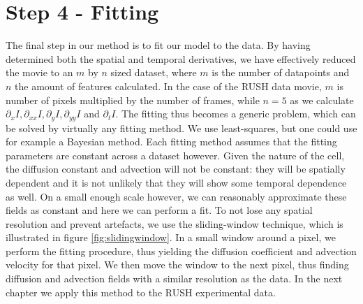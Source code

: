 \documentclass{Dissertate}
\begin{document}
\hypertarget{step-4---fitting}{%
\section{Step 4 - Fitting}\label{step-4---fitting}}

The final step in our method is to fit our model to the data. By having determined both the spatial and temporal derivatives, we have effectively reduced the movie to an $m$ by $n$ sized dataset, where $m$ is the number of datapoints and $n$ the amount of features calculated. In the case of the RUSH data movie, $m$ is number of pixels multiplied by the number of frames, while $n=5$ as we calculate $\partial_x I, \partial_{xx} I, \partial_y I, \partial_{yy} I$ and $\partial_t I$. The fitting thus becomes a generic problem, which can be solved by virtually any fitting method. We use least-squares, but one could use for example a Bayesian method. Each fitting method assumes that the fitting parameters are constant across a dataset however. Given the nature of the cell, the diffusion constant and advection will not be constant: they will be spatially dependent and it is not unlikely that they will show some temporal dependence as well. On a small enough scale however, we can reasonably approximate these fields as constant and here we can perform a fit. To not lose any spatial resolution and prevent artefacts, we use the sliding-window technique, which is illustrated in figure \ref{fig:slidingwindow}. In a small window around a pixel, we perform the fitting procedure, thus yielding the diffusion coefficient and advection velocity for that pixel. We then move the window to the next pixel, thus finding diffusion and advection fields with a similar resolution as the data. In the next chapter we apply this method to the RUSH experimental data.
\end{document}
